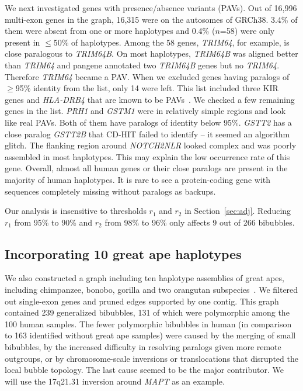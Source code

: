 \documentclass[webpdf,contemporary,large,namedate]{oup-authoring-template}%
\begin{document}
We next investigated genes with presence/absence variants (PAVs).
Out of 16,996 multi-exon genes in the graph,
16,315 were on the autosomes of GRCh38.
3.4\% of them were absent from one or more haplotypes and 0.4\% ($n$=58) were only present in $\le$50\% of haplotypes.
Among the 58 genes, \emph{TRIM64}, for example, is close paralogous to \emph{TRIM64B}.
On most haplotypes, \emph{TRIM64B} was aligned better than \emph{TRIM64} and pangene annotated two \emph{TRIM64B} genes but no \emph{TRIM64}.
Therefore \emph{TRIM64} became a PAV.
When we excluded genes having paralogs of $\ge$95\% identity from the list, only 14 were left.
This list included three KIR genes and \emph{HLA-DRB4} that are known to be PAVs~\citep{Zhou2024.01.20.576452}.
We checked a few remaining genes in the list.
\emph{PRH1} and \emph{GSTM1} were in relatively simple regions and look like real PAVs.
Both of them have paralogs of identity below 95\%.
\emph{GSTT2} has a close paralog \emph{GSTT2B} that CD-HIT failed to identify -- it seemed an algorithm glitch.
The flanking region around \emph{NOTCH2NLR} looked complex and was poorly assembled in most haplotypes.
This may explain the low occurrence rate of this gene.
Overall, almost all human genes or their close paralogs are present in the majority of human haplotypes.
It is rare to see a protein-coding gene with sequences completely missing without paralogs as backups.

Our analysis is insensitive to thresholds $r_1$ and $r_2$ in Section~\ref{sec:adj}.
Reducing $r_1$ from 95\% to 90\% and $r_2$ from 98\% to 96\% only affects 9 out of 266 bibubbles.

\subsection{Incorporating 10 great ape haplotypes}

We also constructed a graph including ten haplotype assemblies of great apes, including chimpanzee, bonobo, gorilla
and two orangutan subspecies~\citep{Makova2023.11.30.569198}.
We filtered out single-exon genes and pruned edges supported by one contig.
This graph contained 239 generalized bibubbles, 131 of which were polymorphic among the 100 human samples.
The fewer polymorphic bibubbles in human (in comparison to 163 identified without great ape samples)
were caused by the merging of small bibubbles,
by the increased difficulty in resolving paralogs given more remote outgroups,
or by chromosome-scale inversions or translocations that disrupted the local bubble topology.
The last cause seemed to be the major contributor.
We will use the 17q21.31 inversion around \emph{MAPT} as an example.
\end{document}

